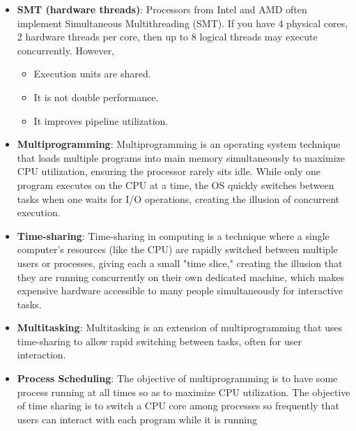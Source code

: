 \documentclass{report}
\begin{document}
\begin{itemize}
\begin{itemize}
                \item Register set
                \item Stack pointer
                \item Processor status flags
            \end{itemize}
            This allows multiple threads to make progress without saving/restoring state on every switch.
            \bigbreak \noindent 
            \textbf{A hardware thread is the execution context in the CPU where a software thread runs.}
        \item \textbf{SMT (hardware threads)}: Processors from Intel and AMD often implement Simultaneous Multithreading (SMT). If you have 4 physical cores, 2 hardware threads per core, then up to 8 logical threads may execute concurrently. However, 
            \begin{itemize}
                \item Execution units are shared.
                \item It is not double performance.
                \item It improves pipeline utilization.
            \end{itemize}
        \item \textbf{Multiprogramming}: Multiprogramming is an operating system technique that loads multiple programs into main memory simultaneously to maximize CPU utilization, ensuring the processor rarely sits idle. While only one program executes on the CPU at a time, the OS quickly switches between tasks when one waits for I/O operations, creating the illusion of concurrent execution. 
        \item \textbf{Time-sharing}: Time-sharing in computing is a technique where a single computer's resources (like the CPU) are rapidly switched between multiple users or processes, giving each a small "time slice," creating the illusion that they are running concurrently on their own dedicated machine, which makes expensive hardware accessible to many people simultaneously for interactive tasks.
        \item \textbf{Multitasking}: Multitasking is an extension of multiprogramming that uses time-sharing to allow rapid switching between tasks, often for user interaction.
        \item \textbf{Process Scheduling}: The objective of multiprogramming is to have some process running at all times so as to maximize CPU utilization.
            \bigbreak \noindent 
            The objective of time sharing is to switch a CPU core among processes so frequently that users can interact with each program while it is running

\end{itemize}
\end{document}
